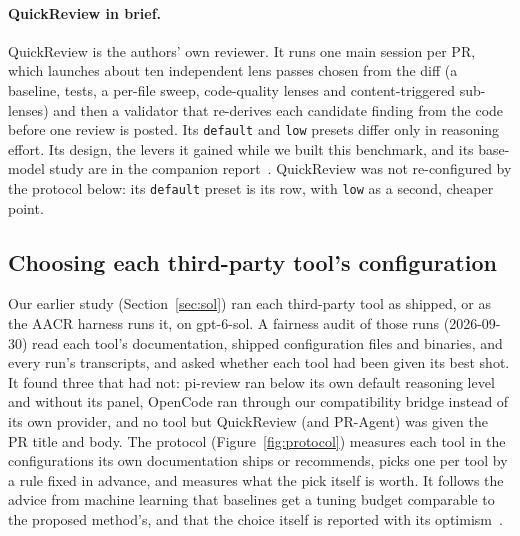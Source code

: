\documentclass[11pt,a4paper]{article}
\newcommand{\qcr}{QuickReview}
\newcommand{\code}[1]{\texttt{#1}}
\begin{document}
\paragraph{\qcr{} in brief.} \qcr{} is the authors' own reviewer. It runs
one main session per PR, which launches about ten independent lens
passes chosen from the diff (a baseline, tests, a per-file sweep,
code-quality lenses and content-triggered sub-lenses) and then a validator
that re-derives each candidate finding from the code before one review is
posted. Its \code{default} and \code{low} presets differ only in reasoning
effort. Its design, the levers it gained while we built this benchmark, and
its base-model study are in the companion report~\cite{qcrreport}. \qcr{}
was not re-configured by the protocol below: its \code{default} preset is
its row, with \code{low} as a second, cheaper point.

\subsection{Choosing each third-party tool's configuration}
\label{sec:bestshot}

Our earlier study (Section~\ref{sec:sol}) ran each third-party tool as
shipped, or as the AACR harness runs it, on gpt-6-sol. A fairness audit of
those runs (2026-09-30) read each tool's documentation, shipped
configuration files and binaries, and every run's transcripts, and asked
whether each tool had been given its best shot. It found three that had
not: pi-review ran below its own default reasoning level and without its
panel, OpenCode ran through our compatibility bridge instead of its own
provider, and no tool but \qcr{} (and PR-Agent) was given the PR title and
body. The protocol (Figure~\ref{fig:protocol}) measures each tool in the
configurations its own documentation ships or recommends, picks one per tool
by a rule fixed in advance, and measures what the pick itself is worth. It
follows the advice from machine learning that baselines get a tuning budget
comparable to the proposed method's, and that the choice itself is reported
with its optimism~\cite{melis2018,lucic2018,cawley2010}.
\end{document}
